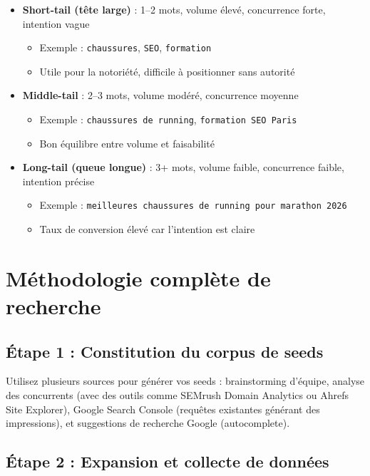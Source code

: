 \documentclass[12pt,a4paper,twoside]{report}
\begin{document}
\begin{itemize}
    \item \textbf{Short-tail (tête large)} : 1--2 mots, volume élevé, concurrence forte, intention vague
    \begin{itemize}
        \item Exemple : \texttt{chaussures}, \texttt{SEO}, \texttt{formation}
        \item Utile pour la notoriété, difficile à positionner sans autorité
    \end{itemize}
    \item \textbf{Middle-tail} : 2--3 mots, volume modéré, concurrence moyenne
    \begin{itemize}
        \item Exemple : \texttt{chaussures de running}, \texttt{formation SEO Paris}
        \item Bon équilibre entre volume et faisabilité
    \end{itemize}
    \item \textbf{Long-tail (queue longue)} : 3+ mots, volume faible, concurrence faible, intention précise
    \begin{itemize}
        \item Exemple : \texttt{meilleures chaussures de running pour marathon 2026}
        \item Taux de conversion élevé car l'intention est claire
    \end{itemize}
\end{itemize}

\section{Méthodologie complète de recherche}

\subsection{Étape 1 : Constitution du corpus de seeds}

Utilisez plusieurs sources pour générer vos seeds : brainstorming d'équipe, analyse des concurrents (avec des outils comme SEMrush Domain Analytics ou Ahrefs Site Explorer), Google Search Console (requêtes existantes générant des impressions), et suggestions de recherche Google (autocomplete).

\subsection{Étape 2 : Expansion et collecte de données}
\end{document}
